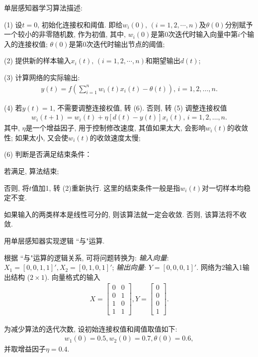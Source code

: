 单层感知器学习算法描述:
\begin{center}
\begin{minipage}{0.8\textwidth}
 (1) 设$t=0$, 初始化连接权和阈值. 即给$w_i (0),\, (i=1, 2, \cdots,n)$及$\theta (0)$分别赋予一个较小的非零随机数, 作为初值,
 其中, $w_i (0)$是第0次迭代时输入向量中第$i$个输入的连接权值; $\theta (0)$是第0次迭代时输出节点的阈值;

 (2) 提供新的样本输入$x_i (t),\, (i=1, 2,\cdots, n)$和期望输出$d(t)$;

 (3) 计算网络的实际输出:
        \begin{align}
            y (t)=f\left (\sum_{i=1}^{n} w_{i} (t) x_{i} (t)-\theta (t)\right),\, i=1,2, \ldots, n.
        \end{align}
\end{minipage}
\end{center}
\begin{center}
\begin{minipage}{0.8\textwidth}
 (4) 若$y (t)=1$, 不需要调整连接权值, 转 (6). 否则, 转 (5) 调整连接权值
        \begin{align}
            w_{i} (t+1)=w_{i} (t)+\eta [d (t)-y (t)] x_i(t),\,  i=1,2, \ldots, n.
        \end{align}
        其中, $\eta$是一个增益因子, 用于控制修改速度, 其值如果太大, 会影响$w_i(t)$的收敛性;
        如果太小, 又会使$w_i(t)$的收敛速度太慢;

 (6) 判断是否满足结束条件：

 \quad{} 若满足, 算法结束;

 \quad{} 否则, 将$t$值加1, 转 (2)重新执行. 这里的结束条件一般是指$w_i (t)$对一切样本均稳定不变.

 \quad{} 如果输入的两类样本是线性可分的, 则该算法就一定会收敛. 否则, 该算法将不收敛.
\end{minipage}
\end{center}
\begin{example}
    用单层感知器实现逻辑 ``与"运算.
\end{example}
\begin{result}
根据 ``与"运算的逻辑关系, 可将问题转换为:
\textit{输入向量}: $X_1=[0, 0, 1, 1]',X_2=[0, 1, 0, 1]'$; \textit{输出向量}: $Y=[0, 0, 0, 1]'$. 网络为2输入1输出结构 ($2\times 1$).
向量格式的输入
\begin{align*}
X=\begin{bmatrix}
  0&0\\
  0&1 \\
  1&0 \\
  1&1
\end{bmatrix},
Y=
\begin{bmatrix}
  0\\
  0\\
  0\\
  1
\end{bmatrix}.
\end{align*}

为减少算法的迭代次数, 设初始连接权值和阈值取值如下:
\begin{align}
    w_1 (0)=0.5,   w_2 (0)=0.7,   \theta (0)=0.6,
\end{align}
并取增益因子$\eta=0.4$.
\end{result}

